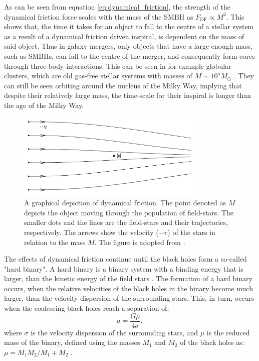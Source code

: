 \documentclass[english, twoside]{HYgradu}
\begin{document}
As can be seen from equation \ref{eq:dynamical_friction}, the strength of the dynamical friction force scales with the mass of the SMBH as $F_\mathrm{DF} \propto M^2$. This shows that, the time it takes for an object to fall to the centre of a stellar system as a result of a dynamical friction driven inspiral, is dependent on the mass of said object. Thus in galaxy mergers, only objects that have a large enough mass, such as SMBHs, can fall to the centre of the merger, and consequently form cores through three-body interactions. This can be seen in for example globular clusters, which are old gas-free stellar systems with masses of $M \sim 10^5 M_\odot$ \citep{BinneyTremaine}. They can still be seen orbiting around the nucleus of the Milky Way, implying that despite their relatively large mass, the time-scale for their inspiral is longer than the age of the Milky Way.

\begin{figure}
	\centering
	\includegraphics[width=0.8\textwidth]{mo_dynamical_friction.png}
	\caption{A graphical depiction of dynamical friction. The point denoted as $M$ depicts the object moving through the population of field-stars. The smaller dots and the lines are the field-stars and their trajectories, respectively. The arrows show the velocity ($-v$) of the stars in relation to the mass $M$. The figure is adopted from \cite{GalaxyFormationAndEvo2010}.}
	\label{figure:dynamical_friction}
\end{figure}

The effects of dynamical friction continue until the black holes form a so-called "hard binary". A hard binary is a binary system with a binding energy that is larger, than the kinetic energy of the field stars \citep{BinneyTremaine}. The formation of a hard binary occurs, when the relative velocities of the black holes in the binary become much larger, than the velocity dispersion of the surrounding stars. This, in turn, occurs when the coalescing black holes reach a separation of:
\begin{equation}
a = \frac{G\mu}{4\sigma},
\end{equation}
where $\sigma$ is the velocity dispersion of the surrounding stars, and $\mu$ is the reduced mass of the binary, defined using the masses $M_1$ and $M_2$ of the black holes as: $\mu = M_1M_2 / M_1 + M_2$ \citep{MerrittBook}.
\end{document}
